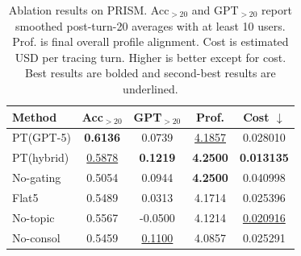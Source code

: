 \begin{table}[t]
\centering
\small
\setlength{\tabcolsep}{3.8pt}
\renewcommand{\arraystretch}{1.08}
\caption{
Ablation results on PRISM. Acc$_{>20}$ and GPT$_{>20}$ report smoothed post-turn-20 averages with at least 10 users. Prof. is final overall profile alignment. Cost is estimated USD per tracing turn. Higher is better except for cost. Best results are bolded and second-best results are underlined.
}
\label{tab:ablation_results}
\begin{tabular*}{\columnwidth}{@{\extracolsep{\fill}}lcccc@{}}
\toprule
Method & Acc$_{>20}$ & GPT$_{>20}$ & Prof. & Cost $\downarrow$ \\
\midrule
PT(GPT-5)
& \textbf{0.6136}
& 0.0739
& \underline{4.1857}
& 0.028010 \\
PT(hybrid)
& \underline{0.5878}
& \textbf{0.1219}
& \textbf{4.2500}
& \textbf{0.013135} \\
No-gating
& 0.5054
& 0.0944
& \textbf{4.2500}
& 0.040998 \\
Flat5
& 0.5489
& 0.0313
& 4.1714
& 0.025396 \\
No-topic
& 0.5567
& -0.0500
& 4.1214
& \underline{0.020916} \\
No-consol
& 0.5459
& \underline{0.1100}
& 4.0857
& 0.025291 \\
\bottomrule
\end{tabular*}
\end{table}

